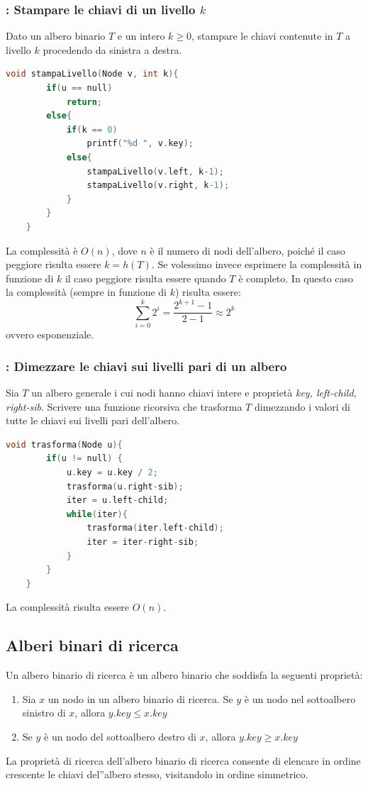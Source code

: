 \documentclass[italian]{article}
\newcommand{\exercize}{\text{\faPencil $\;$ Esercizio }}
\begin{document}
\subsubsection{\exercize: Stampare le chiavi di un livello $k$}
Dato un albero binario $T$ e un intero $k\geq0$, stampare le chiavi contenute in $T$ a livello $k$ procedendo da sinistra a destra.
\begin{lstlisting}[language=c,mathescape=true]
	void stampaLivello(Node v, int k){
		if(u == null)
			return;
		else{
			if(k == 0)
				printf("%d ", v.key);
			else{
				stampaLivello(v.left, k-1);
				stampaLivello(v.right, k-1);
			}
		}
	}
\end{lstlisting}
La complessità è $O(n)$, dove $n$ è il numero di nodi dell'albero, poiché il caso peggiore risulta essere $k = h(T)$. Se volessimo invece esprimere la complessità in funzione di $k$ il caso peggiore risulta essere quando $T$ è completo. In questo caso la complessità (sempre in funzione di $k$) risulta essere:
\[
	\sum_{i=0}^{k}2^i = \dfrac{2^{k+1}-1}{2-1} \approx 2^k 
\]
ovvero esponenziale.

\subsubsection{\exercize: Dimezzare le chiavi sui livelli pari di un albero}
Sia $T$ un albero generale i cui nodi hanno chiavi intere e proprietà \textit{key, left-child, right-sib}. Scrivere una funzione ricorsiva che trasforma $T$ dimezzando i valori di tutte le chiavi sui livelli pari dell'albero.
\begin{lstlisting}[language=c,mathescape=true]
	void trasforma(Node u){
		if(u != null) {
			u.key = u.key / 2;
			trasforma(u.right-sib);
			iter = u.left-child;
			while(iter){
				trasforma(iter.left-child);
				iter = iter-right-sib;
			}
		}
	}
\end{lstlisting}
La complessità risulta essere $O(n)$.
\pagebreak
\subsection{Alberi binari di ricerca}
Un albero binario di ricerca è un albero binario che soddisfa la seguenti proprietà:
\begin{enumerate}[label=\alph*)]
	\item Sia $x$ un nodo in un albero binario di ricerca. Se $y$ è un nodo nel sottoalbero sinistro di $x$, allora $y.key \leq x.key$
	\item Se $y$ è un nodo del sottoalbero destro di $x$, allora $y.key \geq x.key$
\end{enumerate}
La proprietà di ricerca dell'albero binario di ricerca consente di elencare in ordine crescente le chiavi del''albero stesso, visitandolo in ordine simmetrico.
\end{document}

